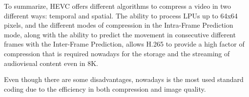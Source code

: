 \documentclass[10pt,journal,compsoc]{IEEEtran}
\begin{document}
To summarize, HEVC offers different algorithms to compress a video in two different ways: temporal and spatial. The ability to process LPUs up to 64x64 pixels, and the different modes of compression in the Intra-Frame Prediction mode, along with the ability to predict the movement in consecutive different frames with the Inter-Frame Prediction, allows H.265 to provide a high factor of compression that is required nowadays for the storage and the streaming of audiovisual content even in 8K.

Even though there are some disadvantages, nowadays is the most used standard coding due to the efficiency in both compression and image quality.






%



\ifCLASSOPTIONcaptionsoff
  \newpage
\fi



\end{document}
